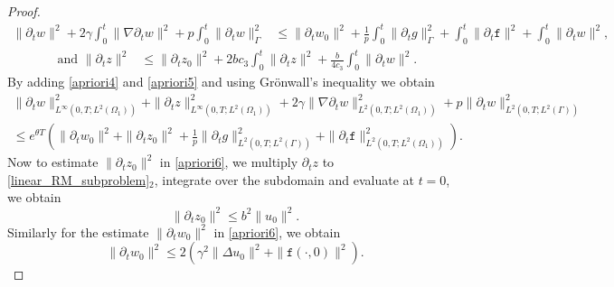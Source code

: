 \documentclass[11pt]{article}
\begin{document}
\begin{proof}
\begin{equation}\label{apriori4}
\begin{aligned}
\parallel \partial_t w\parallel^2 + 2\gamma\int_{0}^t \parallel\nabla  \partial_t w \parallel^2 + p \int_0^t \parallel \partial_t w \parallel^2_{\Gamma}  & \leq \parallel \partial_t w_0\parallel^2 + \frac{1}{p}\int_0^t \parallel \partial_t g \parallel^2_{\Gamma}
+ \int_0^t \parallel \partial_t\mathtt{f} \parallel^2 + \int_0^t \parallel \partial_t w \parallel^2,
\end{aligned}
\end{equation}
\begin{equation}\label{apriori5}
\begin{aligned}
\text{ and } \parallel \partial_t z\parallel^2 & \leq \parallel \partial_t z_0\parallel^2 + 
 2bc_3 \int_0^t \parallel \partial_t z \parallel^2 + \frac{b}{4c_3}\int_0^t \parallel \partial_t w \parallel^2.
\end{aligned}
\end{equation}
By adding \eqref{apriori4} and \eqref{apriori5} and using Gr\"{o}nwall's inequality we obtain 
\begin{equation}\label{apriori6}
\begin{aligned}
\parallel \partial_t w\parallel_{L^{\infty}(0,T; L^2(\Omega_1))}^2+\parallel \partial_t z\parallel_{L^{\infty}(0,T; L^2(\Omega_1))}^2+ 2\gamma\parallel \nabla \partial_t w\parallel^2_{L^{2}(0,T; L^2(\Omega_1))} + p\parallel \partial_t w\parallel^2_{L^{2}(0,T; L^2(\Gamma))} &  \\
\leq e^{\theta T} \left( \parallel \partial_t w_0\parallel^2 + \parallel \partial_t z_0\parallel^2 + \frac{1}{p}\parallel \partial_t g\parallel^2_{L^{2}(0,T; L^2(\Gamma))} + \parallel \partial_t \mathtt{f}\parallel^2_{L^{2}(0,T; L^2(\Omega_1))} \right).
\end{aligned}
\end{equation}
Now to estimate $\parallel \partial_t z_0\parallel^2$ in \eqref{apriori6}, we multiply $\partial_t z$ to \eqref{linear_RM_subproblem}$_{2}$, integrate over the subdomain and evaluate at $t=0$, we obtain 
\begin{equation}\label{apriori7}
\parallel \partial_t z_0\parallel^2 \leq b^2 \parallel u_0\parallel^2.
\end{equation}
Similarly for the estimate $\parallel \partial_t w_0\parallel^2$ in \eqref{apriori6}, we obtain 
\begin{equation}\label{apriori8}
\parallel \partial_t w_0\parallel^2 \leq 2 \left( \gamma^2 \parallel \Delta u_0\parallel^2 + \parallel\mathtt{f}(\cdot,0)\parallel^2 \right).

\end{equation}
\end{proof}
\end{document}
